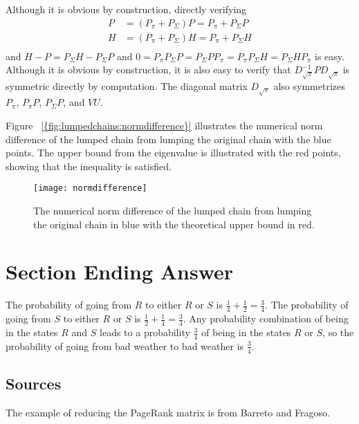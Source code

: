 \documentclass[12pt]{article}
\begin{document}
\begin{example}
    Although it is obvious by construction, directly verifying
    \begin{align*}
        P &= (P_{\pi} + P_{\Sigma}) P = P_{\pi} + P_{\Sigma}P \\
        H &= (P_{\pi} + P_{\Sigma}) H = P_{\pi} + P_{\Sigma}H\\
    \end{align*}
    and \( H - P = P_{\Sigma}H - P_{\Sigma}P \) and \( 0 = P_{\pi} P_{\Sigma}
    P = P_{\Sigma} P P_{\pi} = P_{\pi} P_{\Sigma} H = P_{\Sigma} H P_{\pi}
    \) is easy. Although it is obvious by construction, it is also easy
    to verify that \( D_{\sqrt{\pi}}^{-1}P D_{\sqrt{\pi}} \) is
    symmetric directly by computation. The diagonal matrix \( D_{\sqrt{\pi}}
    \) also symmetrizes \( P_{\pi} \), \( P_{\pi}P \), \( P_{\Sigma}P \),
    and \( VU \).

    Figure~%
    \ref{{fig:lumpedchains:normdifference}} illustrates the numerical
    norm difference of the lumped chain from lumping the original chain
    with the blue points.  The upper bound from the eigenvalue is
    illustrated with the red points, showing that the inequality is
    satisfied.

    \begin{figure}
        \centering
        \texttt{[image: normdifference]}
        \caption{The numerical norm difference of the lumped chain from
        lumping the original chain in blue with the theoretical upper
        bound in red.}%
        \label{fig:lumpedchains:normdifference}
    \end{figure}
\end{example}

\section*{Section Ending Answer}

The probability of going from \( R \) to either \( R \) or \( S \) is \(
\frac{1}{4} + \frac{1}{2} = \frac{3}{4} \).  The probability of going
from \( S \) to either \( R \) or \( S \) is \( \frac{1}{2} + \frac{1}{4}
= \frac{3}{4} \).  Any probability combination of being in the states \(
R \) and \( S \) leads to a probability \( \frac{3}{4} \) of being in
the states \( R \) or \( S \), so the probability of going from bad
weather to bad weather is \( \frac{3}{4} \).

\subsection*{Sources} The example of reducing the PageRank matrix is
from  {Barreto
and Fragoso}.
\end{document}
